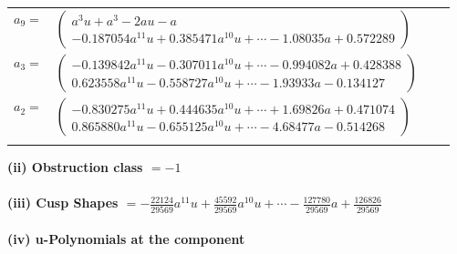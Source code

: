 \documentclass[1p]{elsarticle_modified}
\theoremstyle{definition}
\begin{document}
\begin{tabular}{m{7pt} m{180pt} m{7pt} m{180pt} }
\flushright $a_{9}=$&$\begin{pmatrix}a^3 u+a^3-2 a u- a\\-0.187054 a^{11} u+0.385471 a^{10} u+\cdots-1.08035 a+0.572289\end{pmatrix}$ \\
\flushright $a_{3}=$&$\begin{pmatrix}-0.139842 a^{11} u-0.307011 a^{10} u+\cdots-0.994082 a+0.428388\\0.623558 a^{11} u-0.558727 a^{10} u+\cdots-1.93933 a-0.134127\end{pmatrix}$ \\
\flushright $a_{2}=$&$\begin{pmatrix}-0.830275 a^{11} u+0.444635 a^{10} u+\cdots+1.69826 a+0.471074\\0.865880 a^{11} u-0.655125 a^{10} u+\cdots-4.68477 a-0.514268\end{pmatrix}$\\&\end{tabular}
\flushleft \textbf{(ii) Obstruction class $= -1$}\\~\\
\flushleft \textbf{(iii) Cusp Shapes $= -\frac{22124}{29569} a^{11} u+\frac{45592}{29569} a^{10} u+\cdots-\frac{127780}{29569} a+\frac{126826}{29569}$}\\~\\
\newpage\renewcommand{\arraystretch}{1}
\flushleft \textbf{(iv) u-Polynomials at the component}\newline \\
\end{document}
